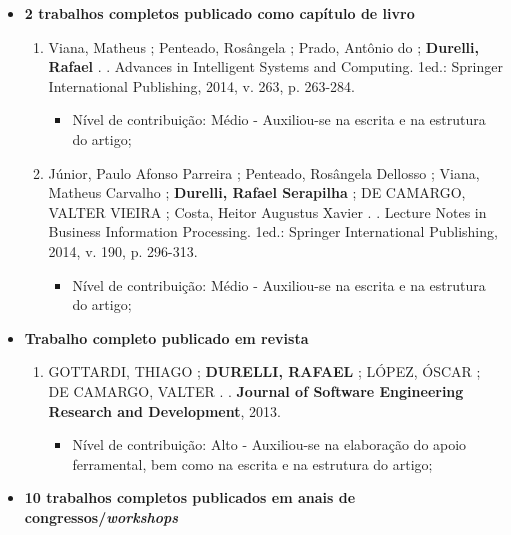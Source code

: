 \begin{itemize}
	
	\item \textbf{2 trabalhos completos publicado como capítulo de livro}
		\begin{enumerate}
			
			\item Viana, Matheus ; Penteado, Rosângela ; Prado, Antônio do ; \textbf{Durelli, Rafael} . . Advances in Intelligent Systems and Computing. 1ed.: Springer International Publishing, 2014, v. 263, p. 263-284.
			
			\begin{itemize}
			\item Nível de contribuição: Médio - Auxiliou-se na escrita e na estrutura do artigo;
			\end{itemize}
			
			\item Júnior, Paulo Afonso Parreira ; Penteado, Rosângela Dellosso ; Viana, Matheus Carvalho ; \textbf{Durelli, Rafael Serapilha} ; DE CAMARGO, VALTER VIEIRA ; Costa, Heitor Augustus Xavier . . Lecture Notes in Business Information Processing. 1ed.: Springer International Publishing, 2014, v. 190, p. 296-313.
			    \begin{itemize}
			    \item Nível de contribuição: Médio - Auxiliou-se na escrita e na estrutura do artigo;
			    \end{itemize}
			
		\end{enumerate}
	
	\item \textbf{Trabalho completo publicado em revista}
		\begin{enumerate}
			\item GOTTARDI, THIAGO ; \textbf{DURELLI, RAFAEL} ; LÓPEZ, ÓSCAR ; DE CAMARGO, VALTER . . \textbf{Journal of Software Engineering Research and Development}, 2013.
			    \begin{itemize}
			        \item Nível de contribuição: Alto - Auxiliou-se na elaboração do apoio ferramental, bem como na escrita e na estrutura do artigo;
			    \end{itemize}
		\end{enumerate}
	\item \textbf{10 trabalhos completos publicados em anais de congressos/\textit{workshops}}
	\begin{enumerate}
	    

\end{enumerate}
\end{itemize}
